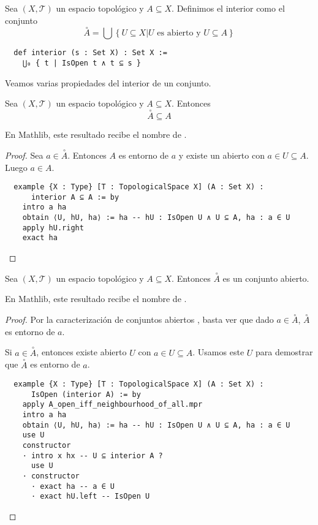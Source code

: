 \newpage

\begin{definition}
    Sea $(X, \mathcal{T})$ un espacio topológico y $A \subseteq X$. Definimos el \textnormal{interior} como el conjunto
    $$
    \overset{\circ}{A} = \bigcup \left\{ U \subseteq X | U \text{ es abierto y } U \subseteq A \right\}
    $$
\end{definition}

\begin{lstlisting}
  def interior (s : Set X) : Set X :=
    ⋃₀ { t | IsOpen t ∧ t ⊆ s }
\end{lstlisting}

Veamos varias propiedades del interior de un conjunto.

\begin{proposition}
  Sea $(X, \mathcal{T})$ un espacio topológico y $A \subseteq X$. Entonces
  $$
  \overset{\circ}{A} \subseteq A
  $$
\end{proposition}

En Mathlib, este resultado recibe el nombre de .

\begin{proof}
  Sea $a \in \overset{\circ}{A}$. Entonces $A$ es entorno de $a$ y existe un abierto con $a \in U \subseteq A$. Luego $a \in A$.

  \begin{lstlisting}
  example {X : Type} [T : TopologicalSpace X] (A : Set X) :
      interior A ⊆ A := by
    intro a ha
    obtain ⟨U, hU, ha⟩ := ha -- hU : IsOpen U ∧ U ⊆ A, ha : a ∈ U
    apply hU.right
    exact ha \end{lstlisting}
\end{proof}

\begin{proposition}
    Sea $(X, \mathcal{T})$ un espacio topológico y $A \subseteq X$. Entonces $\overset{\circ}{A}$ es un conjunto abierto.
\end{proposition}

En Mathlib, este resultado recibe el nombre de .

\begin{proof}
  Por la caracterización de conjuntos abiertos , basta ver que dado $a \in \overset{\circ}{A}$, $\overset{\circ}{A}$ es entorno de $a$.
  
  Si $a \in \overset{\circ}{A}$, entonces existe abierto $U$ con $a \in U \subseteq A$. Usamos este $U$ para demostrar que $\overset{\circ}{A}$ es entorno de $a$.

  \begin{lstlisting}
  example {X : Type} [T : TopologicalSpace X] (A : Set X) :
      IsOpen (interior A) := by
    apply A_open_iff_neighbourhood_of_all.mpr
    intro a ha
    obtain ⟨U, hU, ha⟩ := ha -- hU : IsOpen U ∧ U ⊆ A, ha : a ∈ U
    use U
    constructor
    · intro x hx -- U ⊆ interior A ?
      use U
    · constructor
      · exact ha -- a ∈ U
      · exact hU.left -- IsOpen U \end{lstlisting}
\end{proof}


